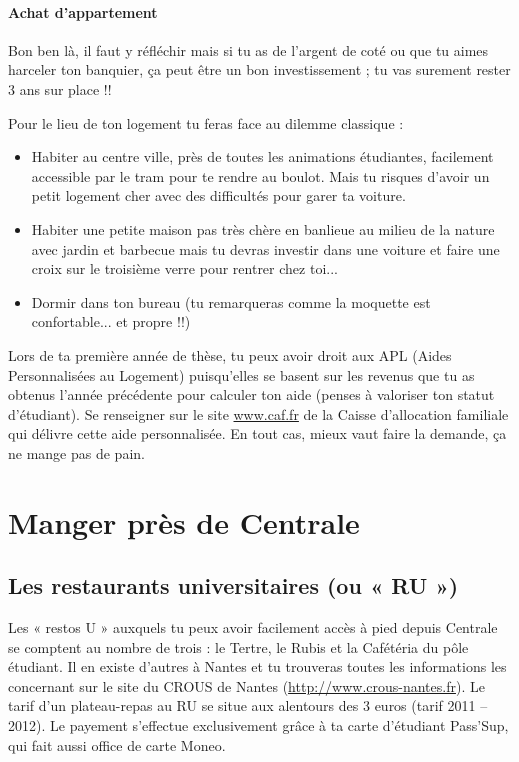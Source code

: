 \paragraph{Achat d'appartement} Bon ben là, il faut y réfléchir mais si tu as de l'argent de coté ou que tu aimes harceler ton banquier, ça peut être un bon investissement ; tu vas surement rester 3 ans sur place !!

Pour le lieu de ton logement tu feras face au dilemme classique :
\begin{itemize}
  \item Habiter au centre ville, près de toutes les animations étudiantes, facilement accessible par le tram pour te rendre au boulot. Mais tu risques d'avoir un petit logement cher avec des difficultés pour garer ta voiture.
  \item Habiter une petite maison pas très chère en banlieue au milieu de la nature avec jardin et barbecue mais tu devras investir dans une voiture et faire une croix sur le troisième verre pour rentrer chez toi...
  \item Dormir dans ton bureau (tu remarqueras comme la moquette est confortable... et propre !!)
\end{itemize}

Lors de ta première année de thèse, tu peux avoir droit aux APL (Aides Personnalisées au Logement) puisqu'elles se basent sur les revenus que tu as obtenus l'année précédente pour calculer ton aide (penses à valoriser ton statut d'étudiant). Se renseigner sur le site \url{www.caf.fr} de la Caisse d'allocation familiale qui délivre cette aide personnalisée. En tout cas, mieux vaut faire la demande, ça ne mange pas de pain.

\section{Manger près de Centrale}\trad
\subsection{Les restaurants universitaires (ou « RU »)}
Les « restos U » auxquels tu peux avoir facilement accès à pied depuis Centrale se comptent au nombre de trois : le Tertre, le Rubis et la Cafétéria du pôle étudiant. Il en existe d'autres à Nantes et tu trouveras toutes les informations les concernant sur le site du CROUS de Nantes (\url{http://www.crous-nantes.fr}). Le tarif d'un plateau-repas au RU se situe aux alentours des 3 euros (tarif 2011 – 2012).
Le payement s'effectue exclusivement grâce à ta carte d'étudiant Pass'Sup, qui fait aussi office de carte Moneo.

